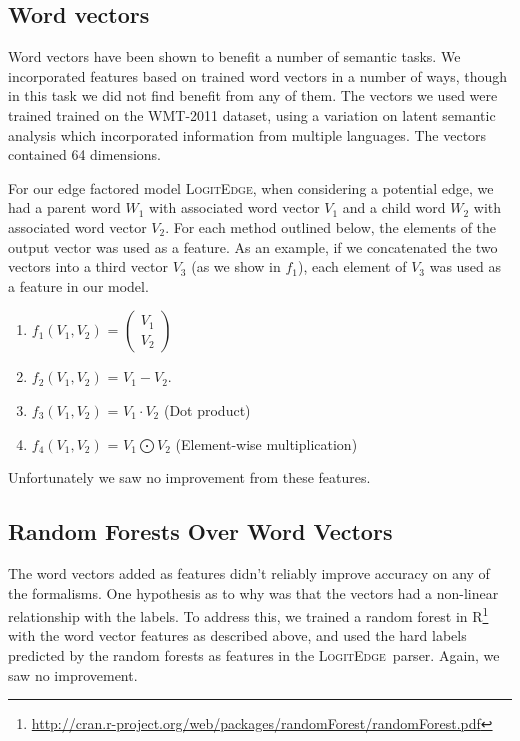 \documentclass[11pt]{article}
\newcommand{\logitedge}{\textsc{LogitEdge}}
\begin{document}
\subsection{Word vectors}
Word vectors have been shown to benefit a number of semantic tasks. We
incorporated features based on trained word vectors in a number of ways, though
in this task we did not find benefit from any of them.
The vectors we used \cite{wordVectors} were trained trained on the WMT-2011
dataset, using a variation on latent semantic analysis which incorporated
information from multiple languages.
The vectors contained 64 dimensions.

For our edge factored model \logitedge, when considering a potential edge, we
had a parent word $W_1$ with associated word vector $V_1$ and a child word
$W_2$ with associated word vector $V_2$.
For each method outlined below, the elements of the output vector was used as a
feature.
As an example, if we concatenated the two vectors into a third vector $V_3$ (as
we show in $f_1$), each element of $V_3$ was used as a feature in our model.

\begin{enumerate}
\item $f_1(V_1,V_2)$ = $ \left( \begin{smallmatrix} V_1\\ V_2 \end{smallmatrix} \right)$
\item $f_2(V_1,V_2)$ = $V_1 - V_2$.
\item $f_3(V_1,V_2)$ = $V_1 \cdot V_2$ (Dot product)
\item $f_4(V_1,V_2)$ = $V_1 \bigodot V_2$ (Element-wise multiplication)
\end{enumerate}
Unfortunately we saw no improvement from these features.

\subsection{Random Forests Over Word Vectors}
The word vectors added as features didn't reliably improve accuracy on any of
the formalisms.
One hypothesis as to why was that the vectors had a non-linear relationship
with the labels.
To address this, we trained a random forest in
R\footnote{\url{http://cran.r-project.org/web/packages/randomForest/randomForest.pdf}}
with the word vector features as described above, and used the hard labels
predicted by the random forests as features in the \logitedge\ parser.
Again, we saw no improvement.
\end{document}
